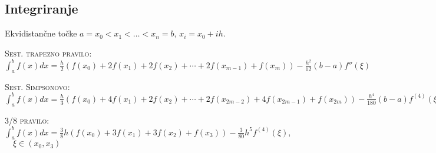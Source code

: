 \documentclass[a4paper,10pt]{article}
\theoremstyle{definition}
\begin{document}
\subsection*{Integriranje}

Ekvidistančne točke $a = x_0 < x_1 < \dots < x_n = b$, $x_i = x_0 + ih$.

\textsc{Sest. trapezno pravilo:} $\int_{a}^{b} f(x) dx = \frac{h}{2} (f(x_0)+2f(x_1)
+2f(x_2)+\cdots + 2f(x_{m-1})+f(x_m))-\frac{h^2}{12}(b-a)f''(\xi)$

\textsc{Sest. Simpsonovo:} $\int_{a}^{b} f(x) dx = \frac{h}{3} (f(x_0)+4f(x_1)
+2f(x_2)+\cdots + 2f(x_{2m-2})+4f(x_{2m-1})+f(x_{2m}))-\frac{h^4}{180}(b-a)f^{(4)}(\xi)$

\textsc{3/8 pravilo:} $\int_a^b f(x) dx = \frac{3}{8} h(f(x_0) + 3f(x_1)
+ 3f(x_2) + f(x_3)) - \frac{3}{80} h^5f^{(4)}(\xi )$, $\quad \xi \in (x_0,x_3)$
\end{document}
